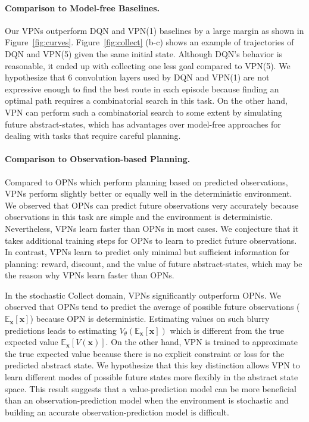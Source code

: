\documentclass{article}
\newcommand{\obsmodel}{{observation-prediction model}}
\newcommand{\valuemodel}{{value-prediction model}}
\newcommand{\cutparagraphup}{\vspace{-2pt}}
\begin{document}
\cutparagraphup
\paragraph{Comparison to Model-free Baselines.} 
Our VPNs outperform DQN and VPN(1) baselines by a large margin as shown in Figure~\ref{fig:curves}. Figure~\ref{fig:collect} (b-c) shows an example of trajectories of DQN and VPN(5) given the same initial state. Although DQN's behavior is reasonable, it ended up with collecting one less goal compared to VPN(5).
We hypothesize that 6 convolution layers used by DQN and VPN(1) are not expressive enough to find the best route in each episode because finding an optimal path requires a combinatorial search in this task. On the other hand, VPN can perform such a combinatorial search to some extent by simulating future abstract-states, which has advantages over model-free approaches for dealing with tasks that require careful planning.

\cutparagraphup
\paragraph{Comparison to Observation-based Planning.}
Compared to OPNs which perform planning based on predicted observations, VPNs perform slightly better or equally well in the deterministic environment. We observed that OPNs can predict future observations very accurately because observations in this task are simple and the environment is deterministic. Nevertheless, VPNs learn faster than OPNs in most cases. We conjecture that it takes additional training steps for OPNs to learn to predict future observations. In contrast, VPNs learn to predict only minimal but sufficient information for planning: reward, discount, and the value of future abstract-states, which may be the reason why VPNs learn faster than OPNs.

In the stochastic Collect domain, VPNs significantly outperform OPNs. We observed that OPNs tend to predict the average of possible future observations ($\mathbb{E}_\textbf{x}[\textbf{x}]$) because OPN is deterministic. Estimating values on such blurry predictions leads to estimating $V_\theta(\mathbb{E}_\textbf{x}[\textbf{x}])$ which is different from the true expected value $\mathbb{E}_\textbf{x}[V(\textbf{x})]$. On the other hand, VPN is trained to approximate the true expected value because there is no explicit constraint or loss for the predicted abstract state. We hypothesize that this key distinction allows VPN to learn different modes of possible future states more flexibly in the abstract state space.
This result suggests that a \valuemodel{} can be more beneficial than an \obsmodel{} when the environment is stochastic and building an accurate \obsmodel{} is difficult.
\end{document}
